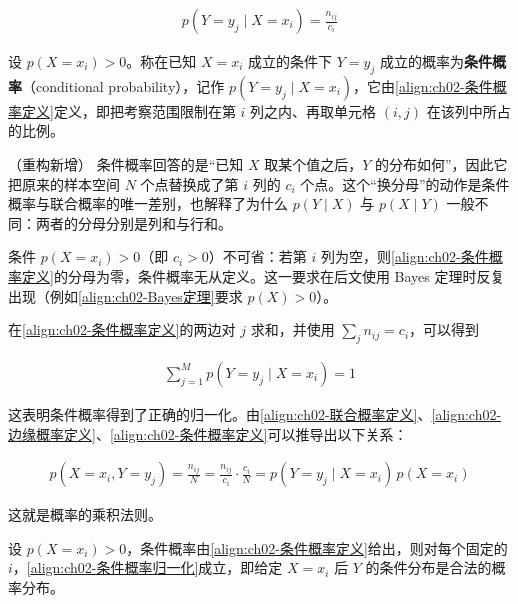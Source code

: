 \documentclass[../../main.tex]{subfiles}
\begin{document}
\begin{align}
  p(Y=y_j\mid X=x_i) = \frac{n_{ij}}{c_i}
  \label{align:ch02-条件概率定义}
\end{align}

\begin{definition}[条件概率]\label{definition:ch02-条件概率}
设 $p(X=x_i)>0$。称在已知 $X=x_i$ 成立的条件下 $Y=y_j$ 成立的概率为\textbf{条件概率}（conditional probability），记作 $p(Y=y_j\mid X=x_i)$，它由\eqref{align:ch02-条件概率定义}定义，即把考察范围限制在第 $i$ 列之内、再取单元格 $(i,j)$ 在该列中所占的比例。
\end{definition}

\begin{remark}（重构新增）
条件概率回答的是“已知 $X$ 取某个值之后，$Y$ 的分布如何”，因此它把原来的样本空间 $N$ 个点替换成了第 $i$ 列的 $c_i$ 个点。这个“换分母”的动作是条件概率与联合概率的唯一差别，也解释了为什么 $p(Y\mid X)$ 与 $p(X\mid Y)$ 一般不同：两者的分母分别是列和与行和。

条件 $p(X=x_i)>0$（即 $c_i>0$）不可省：若第 $i$ 列为空，则\eqref{align:ch02-条件概率定义}的分母为零，条件概率无从定义。这一要求在后文使用 Bayes 定理时反复出现（例如\eqref{align:ch02-Bayes定理}要求 $p(X)>0$）。
\end{remark}

在\eqref{align:ch02-条件概率定义}的两边对 $j$ 求和，并使用 $\sum_j n_{ij}=c_i$，可以得到

\begin{align}
  \sum_{j=1}^{M} p(Y=y_j\mid X=x_i) = 1
  \label{align:ch02-条件概率归一化}
\end{align}

这表明条件概率得到了正确的归一化。由\eqref{align:ch02-联合概率定义}、\eqref{align:ch02-边缘概率定义}、\eqref{align:ch02-条件概率定义}可以推导出以下关系：

\begin{align}
  p(X=x_i,Y=y_j) = \frac{n_{ij}}{N} = \frac{n_{ij}}{c_i}\cdot\frac{c_i}{N} = p(Y=y_j\mid X=x_i)\,p(X=x_i)
  \label{align:ch02-乘积法则离散}
\end{align}

这就是概率的乘积法则。

\begin{proposition}[条件概率的归一化]\label{proposition:ch02-条件概率归一化}
设 $p(X=x_i)>0$，条件概率由\eqref{align:ch02-条件概率定义}给出，则对每个固定的 $i$，\eqref{align:ch02-条件概率归一化}成立，即给定 $X=x_i$ 后 $Y$ 的条件分布是合法的概率分布。
\end{proposition}
\end{document}
